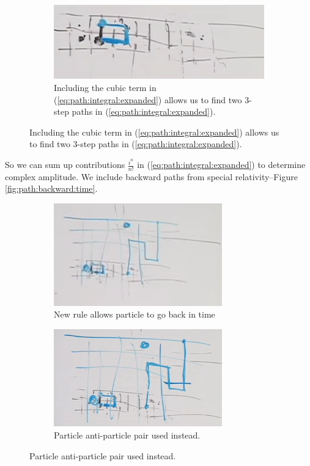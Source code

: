 \documentclass[]{article}
\begin{document}
\begin{figure}[H]
	\begin{subfigure}{0.45\textwidth}
		\caption{Including the cubic term in (\ref{eq:path:integral:expanded}) allows us to find two 3-step paths in (\ref{eq:path:integral:expanded}).}\label{fig:path-integral9}
		\includegraphics[width=1.0\textwidth]{path-integral9}
	\end{subfigure}
\end{figure}

So we can sum up contributions $\frac{i^n}{n !}$ in (\ref{eq:path:integral:expanded}) to determine complex amplitude. We include backward paths from special relativity--Figure \ref{fig:path:backward:time}.

\begin{figure}[H]
	\caption{Path going backwards in Time. We can think of it in two ways.}\label{fig:path:backward:time}
	\begin{subfigure}{0.45\textwidth}
		\caption{New rule allows particle to go back in time}
		\includegraphics[width=0.8\textwidth]{path-backward-time}
	\end{subfigure}
	\begin{subfigure}{0.45\textwidth}
		\caption{Particle anti-particle pair used instead.}
		\includegraphics[width=0.8\textwidth]{path-backward-time1}
	\end{subfigure}
\end{figure}
\end{document}
